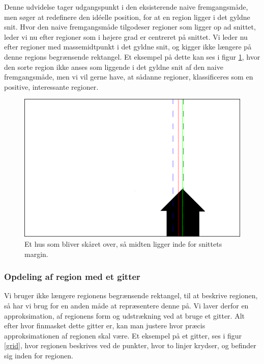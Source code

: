{
Denne udvidelse tager udgangspunkt i den eksisterende naive
fremgangsmåde, men søger at redefinere den idéelle position, for at en
region ligger i det gyldne snit. Hvor den naive fremgangsmåde tilgodeser
regioner som ligger op ad snittet, leder vi nu efter regioner som i
højere grad er centreret på snittet. Vi leder nu efter regioner med
massemidtpunkt i det gyldne snit, og kigger ikke længere på denne
regions begrænsende rektangel. Et eksempel på dette kan ses i
figur \ref{hus}, hvor den sorte region ikke anses som liggende i det
gyldne snit af den naive fremgangsmåde, men vi vil gerne have, at sådanne
regioner, klassificeres som en positive, interessante regioner.

\begin{figure}[h]
	\begin{center}
		\includegraphics[scale=0.3,angle=0]{afsnit/vores_implementation/billeder/udvidet_loesning/husworks.png}
	\end{center}
	\caption[]{Et hus som bliver skåret over, så midten ligger inde for
    snittets margin.}
	\label{hus}
\end{figure}

\subsubsection{Opdeling af region med et gitter}
Vi bruger ikke længere regionens begrænsende rektangel, til at beskrive
regionen, så har vi brug for en anden måde at repræsentere denne på. Vi
laver derfor en approksimation, af regionens form og udstrækning ved at
bruge et gitter.  Alt efter hvor finmasket dette gitter er, kan man
justere hvor præcis approksimationen af regionen skal være. Et eksempel
på et gitter, ses i figur \ref{grid}, hvor regionen beskrives ved de
punkter, hvor to linjer krydser, og befinder sig inden for regionen.

}
